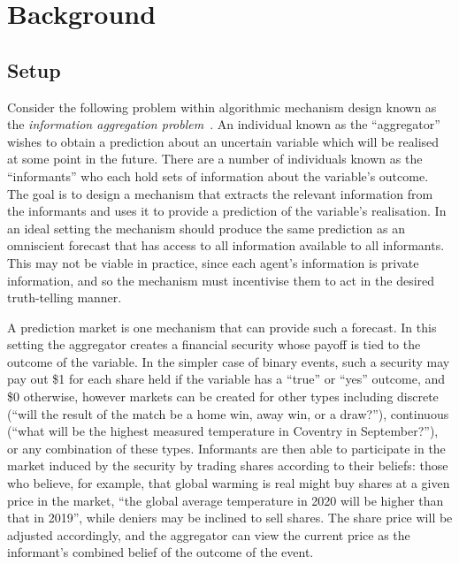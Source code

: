 \section{Background}

\label{sec:background}

\subsection{Setup}

Consider the following problem within algorithmic mechanism design known as the
\emph{information aggregation problem}~\cite[Ch.~26]{AGTBook}. An individual
known as the ``aggregator'' wishes to obtain a prediction about an uncertain
variable which will be realised at some point in the future. There are a number
of individuals known as the ``informants'' who each hold sets of information
about the variable's outcome. The goal is to design a mechanism that extracts
the relevant information from the informants and uses it to provide a
prediction of the variable's realisation. In an ideal setting the mechanism
should produce the same prediction as an omniscient forecast that has access to
all information available to all informants. This may not be viable in
practice, since each agent's information is private information, and so the
mechanism must incentivise them to act in the desired truth-telling manner.

A prediction market is one mechanism that can provide such a forecast. In this
setting the aggregator creates a financial security whose payoff is tied to the
outcome of the variable. In the simpler case of binary events, such a security
may pay out \$1 for each share held if the variable has a ``true'' or ``yes''
outcome, and \$0 otherwise, however markets can be created for other types
including discrete (``will the result of the match be a home win, away win, or
a draw?''), continuous (``what will be the highest measured temperature in
Coventry in September?''), or any combination of these types. Informants are
then able to participate in the market induced by the security by trading
shares according to their beliefs: those who believe, for example, that global
warming is real might buy shares at a given price in the market, ``the global
average temperature in 2020 will be higher than that in 2019'', while deniers
may be inclined to sell shares. The share price will be adjusted accordingly,
and the aggregator can view the current price as the informant's combined
belief of the outcome of the event.

